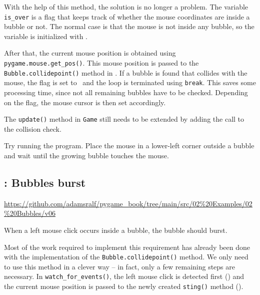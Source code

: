
With the help of this method, the solution is no longer a problem. The variable \texttt{is\_over} is a flag that keeps track of whether the mouse coordinates are inside a bubble or not. The normal case is that the mouse is not inside any bubble, so the variable is initialized with \false.

After that, the current mouse position is obtained using \texttt{pygame.mouse.\-get\-\_pos()}. This mouse position is passed to the \texttt{Bubble.collidepoint()} method in . If a bubble is found that collides with the mouse, the flag is set to \true\ and the loop is terminated using \texttt{break}. This saves some processing time, since not all remaining bubbles have to be checked. Depending on the flag, the mouse cursor is then set accordingly.


The \texttt{update()} method in \texttt{Game} still needs to be extended by adding the call to the collision check.


Try running the program. Place the mouse in a lower-left corner outside a bubble and wait until the growing bubble touches the mouse.

\subsection{: Bubbles burst}
\begin{diskbox}
	\url{https://github.com/adamsralf/pygame_book/tree/main/src/02%20Examples/02%20Bubbles/v06}
\end{diskbox}

	When a left mouse click occurs inside a bubble, the bubble should burst.
\er

Most of the work required to implement this requirement has already been done with the implementation of the \texttt{Bubble.collidepoint()} method. We only need to use this method in a clever way -- in fact, only a few remaining steps are necessary. In \texttt{watch\_for\_events()}, the left mouse click is detected first () and the current mouse position is passed to the newly created \texttt{sting()} method ().

